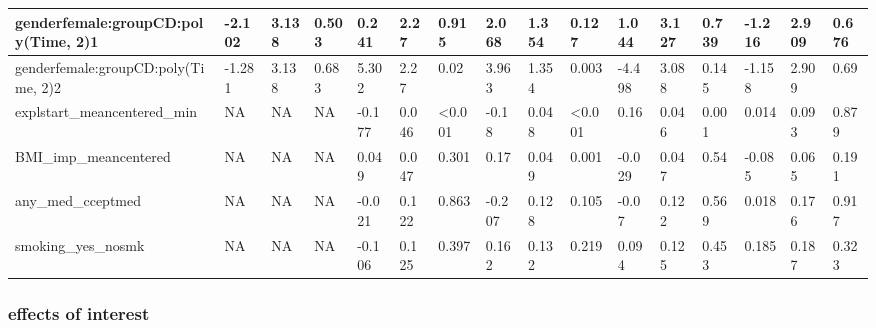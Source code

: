 \documentclass[
]{article}
\newenvironment{Shaded}{\begin{snugshade}}{\end{snugshade}}
\newcommand{\CommentTok}[1]{\textcolor[rgb]{0.56,0.35,0.01}{\textit{#1}}}
\newcommand{\DecValTok}[1]{\textcolor[rgb]{0.00,0.00,0.81}{#1}}
\newcommand{\FunctionTok}[1]{\textcolor[rgb]{0.00,0.00,0.00}{#1}}
\newcommand{\NormalTok}[1]{#1}
\newcommand{\OtherTok}[1]{\textcolor[rgb]{0.56,0.35,0.01}{#1}}
\newcommand{\SpecialCharTok}[1]{\textcolor[rgb]{0.00,0.00,0.00}{#1}}
\newcommand{\StringTok}[1]{\textcolor[rgb]{0.31,0.60,0.02}{#1}}
\begin{document}
\begin{table}
\begin{tabular}[t]{l|l|l|l|l|l|l|l|l|l|l|l|l|l|l|l}
\hline
genderfemale:groupCD:poly(Time, 2)1 & -2.102 & 3.138 & 0.503 & 0.241 & 2.27 & 0.915 & 2.068 & 1.354 & 0.127 & 1.044 & 3.127 & 0.739 & -1.216 & 2.909 & 0.676\\
\hline
genderfemale:groupCD:poly(Time, 2)2 & -1.281 & 3.138 & 0.683 & 5.302 & 2.27 & 0.02 & 3.963 & 1.354 & 0.003 & -4.498 & 3.088 & 0.145 & -1.158 & 2.909 & 0.69\\
\hline
explstart\_meancentered\_min & NA & NA & NA & -0.177 & 0.046 & <0.001 & -0.18 & 0.048 & <0.001 & 0.16 & 0.046 & 0.001 & 0.014 & 0.093 & 0.879\\
\hline
BMI\_imp\_meancentered & NA & NA & NA & 0.049 & 0.047 & 0.301 & 0.17 & 0.049 & 0.001 & -0.029 & 0.047 & 0.54 & -0.085 & 0.065 & 0.191\\
\hline
any\_med\_cceptmed & NA & NA & NA & -0.021 & 0.122 & 0.863 & -0.207 & 0.128 & 0.105 & -0.07 & 0.122 & 0.569 & 0.018 & 0.176 & 0.917\\
\hline
smoking\_yes\_nosmk & NA & NA & NA & -0.106 & 0.125 & 0.397 & 0.162 & 0.132 & 0.219 & 0.094 & 0.125 & 0.453 & 0.185 & 0.187 & 0.323\\
\hline
\end{tabular}
\end{table}

\hypertarget{effects-of-interest}{%
\subsubsection{effects of interest}\label{effects-of-interest}}

\begin{Shaded}
\end{Shaded}
\end{document}
